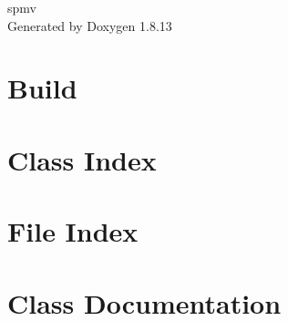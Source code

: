 \documentclass[twoside]{book}
\newcommand{\+}{\discretionary{\mbox{\scriptsize$\hookleftarrow$}}{}{}}
\newcommand{\clearemptydoublepage}{%
  \newpage{\pagestyle{empty}\cleardoublepage}%
}
\begin{document}
\hypersetup{pageanchor=false,
             bookmarksnumbered=true,
             pdfencoding=unicode
            }
\begin{titlepage}
\vspace*{7cm}
\begin{center}%
{\Large spmv }\\
\vspace*{1cm}
{\large Generated by Doxygen 1.8.13}\\
\end{center}
\end{titlepage}
\clearemptydoublepage
{}
\tableofcontents
\clearemptydoublepage
{}
\hypersetup{pageanchor=true}

\chapter{Build}
\label{md__home_tau_public_html_lecture_parallel_distributed_2018_handson_tau_parallel-distributed-handson_03spmv_README}

\chapter{Class Index}

\chapter{File Index}

\chapter{Class Documentation}














\end{document}
